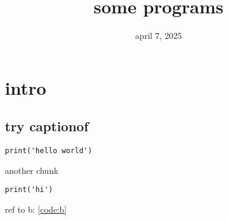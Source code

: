 \documentclass[a4paper]{report}
\begin{document}

\title{some programs}
\date{april 7, 2025}

\maketitle

{\sffamily
\tableofcontents
}

\chapter{intro}\label{ch:intro}

\section{try captionof}

\setcounter{code}{0}


\begin{verbatim}
print('hello world')
\end{verbatim}

another chunk


\begin{verbatim}
print('hi')
\end{verbatim}

ref to b: \ref{code:b}
\end{document}
